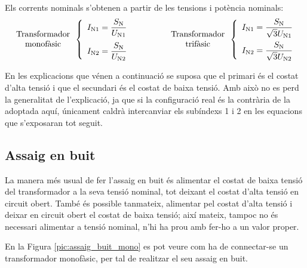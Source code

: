 Els corrents nominals s'obtenen a partir de les tensions i potència
nominals:
\begin{equation}
\begin{array}{c}\text{Transformador}\\
\text{monofàsic}
\end{array} \left\{
\begin{array}{l}
   I_\mathrm{N1} = \dfrac{S_\mathrm{N}}{U_\mathrm{N1}} \\[2.7ex]
   I_\mathrm{N2} = \dfrac{S_\mathrm{N}}{U_\mathrm{N2}}
\end{array}
\right. \qquad\qquad
\begin{array}{c}\text{Transformador}\\
\text{trifàsic}
\end{array} \left\{
\begin{array}{l}
   I_\mathrm{N1} = \dfrac{S_\mathrm{N}}{\sqrt{3}U_\mathrm{N1}} \\[2.5ex]
   I_\mathrm{N2} = \dfrac{S_\mathrm{N}}{\sqrt{3}U_\mathrm{N2}}
\end{array}
\right.
\end{equation}

En les explicacions que vénen a continuació se suposa que el
primari és el costat d'alta tensió i que el secundari és el costat
de baixa tensió. Amb això no es perd la generalitat de
l'explicació, ja que si la configuració real és la contrària de la
adoptada aquí, únicament caldrà intercanviar els subíndexs 1 i 2 en
les equacions que s'exposaran tot seguit.

\subsection{Assaig en buit}

La manera més usual de fer l'assaig en buit és alimentar el costat
de baixa tensió del transformador a  la seva tensió nominal, tot
deixant el costat d'alta tensió en circuit obert. També és possible
tanmateix, alimentar pel costat d'alta tensió i deixar en circuit
obert el costat de baixa tensió; així mateix, tampoc no és necessari
alimentar a tensió nominal, n'hi ha prou amb fer-ho a un valor proper.

En la Figura \vref{pic:assaig_buit_mono} es pot veure com ha de
connectar-se un transformador monofàsic, per tal de realitzar el seu
assaig en buit.

\begin{center}
    
    \label{pic:assaig_buit_mono}
\end{center}

